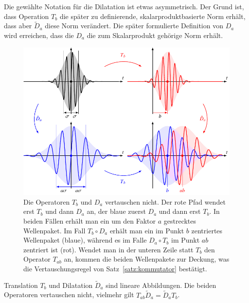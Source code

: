 Die gewählte Notation für die Dilatation ist etwas asymmetrisch.
Der Grund ist, dass Operation $T_b$ die später zu definierende,
skalarproduktbasierte Norm erhält, dass aber $\tilde{D}_a$ diese Norm
verändert.
Die später formulierte Definition von $D_a$ wird erreichen, dass 
die $D_a$ die zum Skalarprodukt gehörige Norm erhält.

\begin{figure}
\centering
\includegraphics[width=\hsize]{chapters/1-geometrie/images/kommutator.pdf}
\caption{Die Operatoren $T_b$ und $D_a$ vertauschen nicht.
Der rote Pfad wendet erst $T_b$ und dann $D_a$ an, der blaue zuerst
$D_a$ und dann erst $T_b$.
In beiden Fällen erhält man ein um den Faktor $a$ gestrecktes
Wellenpaket.
Im Fall $T_b\circ D_a$ erhält man ein im Punkt $b$ zentriertes Wellenpaket
(blaue), während es im Falle $D_a\circ T_b$ im Punkt $ab$ zentriert ist (rot).
Wendet man in der unteren Zeile statt $T_b$ den Operator $T_{ab}$ an, 
kommen die beiden Wellenpakete zur Deckung, was die Vertauschungsregel
von Satz~\ref{satz:kommutator} bestätigt.
\label{geometrie:kommutator:image}}
\end{figure}

\begin{satz}
\label{satz:kommutator}
Translation $T_b$ und Dilatation $\tilde{D}_a$ sind lineare Abbildungen.
Die beiden Operatoren vertauschen nicht, vielmehr gilt
$T_{ab}\tilde{D}_a = \tilde{D}_aT_b$.
\end{satz}
%

